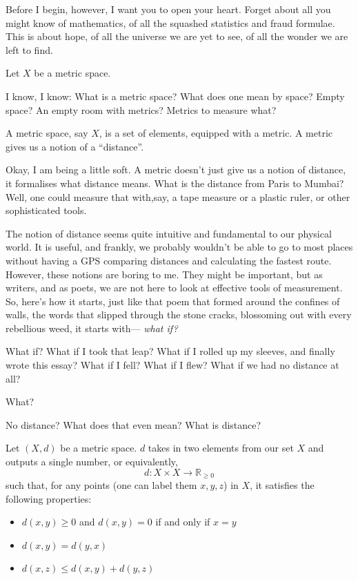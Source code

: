 \documentclass[11pt, letterpaper]{article}
\begin{document}
Before I begin, however, I want you to open your heart. Forget about all you might know of mathematics, of all the squashed statistics and fraud formulae. This is about hope, of all the universe we are yet to see, of all the wonder we are left to find.

\begin{mathbox}
Let $X$ be a metric space.
\end{mathbox}

I know, I know: What is a metric space? What does one mean by space? Empty space? An empty room with metrics? Metrics to measure what?

\begin{mathbox}
A metric space, say $X$, is a set of elements, equipped with a metric. A metric gives us a notion of a ``distance''.
\end{mathbox}

Okay, I am being a little soft. A metric doesn't just give us a notion of distance, it formalises what distance means. What is the distance from Paris to Mumbai? Well, one could measure that with,say, a tape measure or a plastic ruler, or other sophisticated tools. 

The notion of distance seems quite intuitive and fundamental to our physical world. It is useful, and frankly, we probably wouldn't be able to go to most places without having a GPS comparing distances and calculating the fastest route. However, these notions are boring to me. They might be important, but as writers, and as poets, we are not here to look at effective tools of measurement. So, here's how it starts, just like that poem that formed around the confines of walls, the words that slipped through the stone cracks, blossoming out with every rebellious weed, it starts with— \textit{what if?}

What if? What if I took that leap? What if I rolled up my sleeves, and finally wrote this essay? What if I fell? What if I flew? What if we had no distance at all?

What?

No distance? What does that even mean? What is distance?

\begin{mathbox}
Let $(X,d)$ be a metric space. $d$ takes in two elements from our set $X$ and outputs a single number, or equivalently,
\[
d : X \times X \to \mathbb{R}_{\geq 0}
\]
such that, for any points (one can label them $x, y, z$) in $X$, it satisfies the following properties:
\begin{itemize}
  \item $d(x,y) \geq 0$ and $d(x,y) = 0$ if and only if $x=y$ 
  \item $d(x,y) = d(y,x)$ 
  \item $d(x,z) \leq d(x,y) + d(y,z)$ 
\end{itemize}
\end{mathbox}
\end{document}
